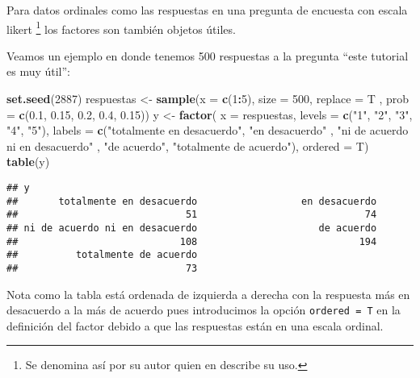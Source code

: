 \documentclass[]{article}
\newenvironment{Shaded}{\begin{snugshade}}{\end{snugshade}}
\newcommand{\KeywordTok}[1]{\textcolor[rgb]{0.13,0.29,0.53}{\textbf{#1}}}
\newcommand{\DataTypeTok}[1]{\textcolor[rgb]{0.13,0.29,0.53}{#1}}
\newcommand{\DecValTok}[1]{\textcolor[rgb]{0.00,0.00,0.81}{#1}}
\newcommand{\FloatTok}[1]{\textcolor[rgb]{0.00,0.00,0.81}{#1}}
\newcommand{\StringTok}[1]{\textcolor[rgb]{0.31,0.60,0.02}{#1}}
\newcommand{\OperatorTok}[1]{\textcolor[rgb]{0.81,0.36,0.00}{\textbf{#1}}}
\newcommand{\NormalTok}[1]{#1}
\let\rmarkdownfootnote\footnote%
\def\footnote{\protect\rmarkdownfootnote}
\begin{document}
Para datos ordinales como las respuestas en una pregunta de encuesta con
escala likert
\footnote{Se denomina así por su autor quien en \parencite{likert1932} describe su uso.}
los factores son también objetos útiles.

Veamos un ejemplo en donde tenemos 500 respuestas a la pregunta ``este
tutorial es muy útil'':

\begin{Shaded}
\begin{Highlighting}[]
\KeywordTok{set.seed}\NormalTok{(}\DecValTok{2887}\NormalTok{)}
\NormalTok{respuestas <-}\StringTok{ }\KeywordTok{sample}\NormalTok{(}\DataTypeTok{x =} \KeywordTok{c}\NormalTok{(}\DecValTok{1}\OperatorTok{:}\DecValTok{5}\NormalTok{), }\DataTypeTok{size =} \DecValTok{500}\NormalTok{, }\DataTypeTok{replace =}\NormalTok{  T}
\NormalTok{                     , }\DataTypeTok{prob =} \KeywordTok{c}\NormalTok{(}\FloatTok{0.1}\NormalTok{, }\FloatTok{0.15}\NormalTok{, }\FloatTok{0.2}\NormalTok{, }\FloatTok{0.4}\NormalTok{, }\FloatTok{0.15}\NormalTok{))}
\NormalTok{y <-}\StringTok{ }\KeywordTok{factor}\NormalTok{(}
  \DataTypeTok{x =}\NormalTok{ respuestas,}
  \DataTypeTok{levels =} \KeywordTok{c}\NormalTok{(}\StringTok{"1"}\NormalTok{, }\StringTok{"2"}\NormalTok{, }\StringTok{"3"}\NormalTok{, }\StringTok{"4"}\NormalTok{, }\StringTok{"5"}\NormalTok{),}
  \DataTypeTok{labels =} \KeywordTok{c}\NormalTok{(}\StringTok{"totalmente en desacuerdo"}\NormalTok{, }\StringTok{"en desacuerdo"}
\NormalTok{             , }\StringTok{"ni de acuerdo ni en desacuerdo"}
\NormalTok{             , }\StringTok{"de acuerdo"}\NormalTok{, }\StringTok{"totalmente de acuerdo"}\NormalTok{),}
  \DataTypeTok{ordered =}\NormalTok{ T)}
\KeywordTok{table}\NormalTok{(y)}
\end{Highlighting}
\end{Shaded}

\begin{verbatim}
## y
##       totalmente en desacuerdo                  en desacuerdo 
##                             51                             74 
## ni de acuerdo ni en desacuerdo                     de acuerdo 
##                            108                            194 
##          totalmente de acuerdo 
##                             73
\end{verbatim}

Nota como la tabla está ordenada de izquierda a derecha con la respuesta
más en desacuerdo a la más de acuerdo pues introducimos la opción
\texttt{ordered\ =\ T} en la definición del factor debido a que las
respuestas están en una escala ordinal.
\end{document}
